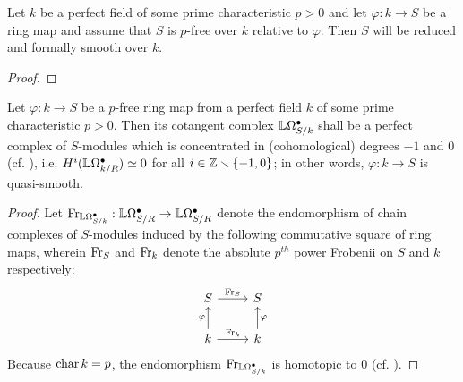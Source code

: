             \begin{proposition} \label{prop: p_free_algebras_are_reduced_and_formally_smooth}
                Let $k$ be a perfect field of some prime characteristic $p > 0$ and let $\varphi: k \to S$ be a ring map and assume that $S$ is $p$-free over $k$ relative to $\varphi$. Then $S$ will be reduced and formally smooth over $k$.
            \end{proposition}
                \begin{proof}
                    
                \end{proof}
            \begin{corollary} \label{coro: p_free_algebras_are_quasi_smooth}
                Let $\varphi: k \to S$ be a $p$-free ring map from a perfect field $k$ of some prime characteristic $p > 0$. Then its cotangent complex $\mathbb{L}\Omega^{\bullet}_{S/k}$ shall be a perfect complex of $S$-modules which is concentrated in (cohomological) degrees $-1$ and $0$ (cf. \cite[\href{https://stacks.math.columbia.edu/tag/08SL}{Tag 08SL}]{stacks}), i.e. $H^i(\mathbb{L}\Omega^{\bullet}_{k/R}) \simeq 0$ for all $i \in \mathbb{Z} \smallsetminus \{-1, 0\}$; in other words, $\varphi: k \to S$ is quasi-smooth.
            \end{corollary}
                \begin{proof}
                    Let $\mathrm{Fr}_{\mathbb{L}\Omega^{\bullet}_{S/k}}: \mathbb{L}\Omega^{\bullet}_{S/R} \to \mathbb{L}\Omega^{\bullet}_{S/R}$ denote the endomorphism of chain complexes of $S$-modules induced by the following commutative square of ring maps, wherein $\mathrm{Fr}_S$ and $\mathrm{Fr}_k$ denote the absolute $p^{th}$ power Frobenii on $S$ and $k$ respectively:
                        $$
                            \begin{tikzcd}
                            	S & S \\
                            	k & k
                            	\arrow["\varphi", from=2-1, to=1-1]
                            	\arrow["\varphi"', from=2-2, to=1-2]
                            	\arrow["{\Frob_S}", from=1-1, to=1-2]
                            	\arrow["{\Frob_k}", from=2-1, to=2-2]
                            \end{tikzcd}
                        $$
                    Because $\operatorname{char} k = p$, the endomorphism $\mathrm{Fr}_{\mathbb{L}\Omega^{\bullet}_{S/k}}$ is homotopic to $0$ (cf. \cite[\href{https://stacks.math.columbia.edu/tag/0G5Z}{Tag 0G5Z}]{stacks}).
                \end{proof}
